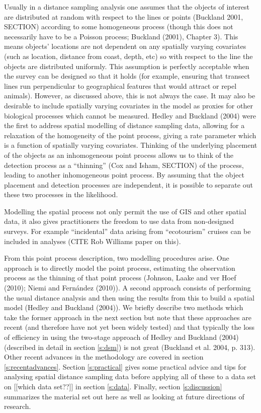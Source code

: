 \documentclass[useAMS,referee]{biom}
\begin{document}
Usually in a distance sampling analysis one assumes that the objects of interest are distributed at random with respect to the lines or points (Buckland 2001, SECTION) according to some homogeneous process (though this does not necessarily have to be a Poisson process; Buckland (2001), Chapter 3). This means objects' locations are not dependent on any spatially varying covariates (such as location, distance from coast, depth, etc) so with respect to the line the objects are distributed uniformly. This assumption is perfectly acceptable when the survey can be designed so that it holds (for example, ensuring that transect lines run perpendicular to geographical features that would attract or repel animals). However, as discussed above, this is not always the case. It may also be desirable to include spatially varying covariates in the model as proxies for other biological processes which cannot be measured. Hedley and Buckland (2004) were the first to address spatial modelling of distance sampling data, allowing for a relaxation of the homogeneity of the point process, giving a rate parameter which is a function of spatially varying covariates. Thinking of the underlying placement of the objects as an inhomogeneous point process allows us to think of the detection process as a ``thinning'' (Cox and Isham, SECTION) of the process, leading to another inhomogeneous point process. By assuming that the object placement and detection processes are independent, it is possible to separate out these two processes in the likelihood.

Modelling the spatial process not only permit the use of GIS and other spatial data, it also gives practitioners the freedom to use data from non-designed surveys. For example ``incidental'' data arising from ``ecotourism'' cruises can be included in analyses (CITE Rob Williams paper on this).

From this point process description, two modelling procedures arise. One approach is to directly model the point process, estimating the observation process as the thinning of that point process (Johnson, Laake and ver Hoef (2010); Niemi and Fern\'andez (2010)). A second approach consists of performing the usual distance analysis and then using the results from this to build a spatial model (Hedley and Buckland (2004)). We briefly describe two methods which take the former approach in the next section but note that these approaches are recent (and therefore have not yet been widely tested) and that typically the loss of efficiency in using the two-stage approach of Hedley and Buckland (2004) (described in detail in section \ref{s:dsm}) is not great (Buckland et al. 2004, p. 313). Other recent advances in the methodology are covered in section \ref{s:recentadvances}. Section \ref{s:practical} gives some practical advice and tips for analysing spatial distance sampling data before applying all of these to a data set on [[which data set??]] in section \ref{s:data}. Finally, section \ref{s:discussion} summarizes the material set out here as well as looking at future directions of research.
\end{document}
